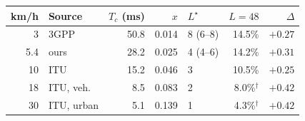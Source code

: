 \begin{tabular}{rlrrlrr}
\toprule
km/h & Source & $T_c$ (ms) & $x$ & $L^\star$ & $L{=}48$ & $\Delta$ \\
\midrule
3 & 3GPP~\cite{3gpp_tr38913} & 50.8 & 0.014 & 8 (6--8) & 14.5\% & $+0.27$ \\
5.4 & ours & 28.2 & 0.025 & 4 (4--6) & 14.2\% & $+0.31$ \\
10 & ITU~\cite{itu_m2410} & 15.2 & 0.046 & 3 & 10.5\% & $+0.25$ \\
18 & ITU, veh. & 8.5 & 0.083 & 2 & 8.0\%$^\dagger$ & $+0.42$ \\
30 & ITU, urban & 5.1 & 0.139 & 1 & 4.3\%$^\dagger$ & $+0.42$ \\
\bottomrule
\end{tabular}

